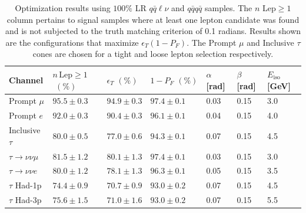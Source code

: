 \begin{table}

\begin{tabular}{|p{}|p{}p{}p{}p{}p{}p{}|}

\hline 
Channel & $n\,\text{Lep}\geq 1$ $\,\, (\%)$  & $\epsilon_T \, \, (\%)$ & $1-P_{F} \, \, (\%)$ & $\alpha$ [rad] & $\beta$ [rad] & $E_{\text{iso}}$ [GeV] \\ 
\hline 
Prompt $\mu$ & $95.5 \pm 0.3$  & $94.9 \pm 0.3$ & $97.4 \pm 0.1$& 0.03 & 0.15 & 3.0 \\ 

Prompt $e$ & $92.0 \pm 0.3$  & $90.4 \pm 0.3$ & $96.1 \pm 0.1$ & 0.04 & 0.15 & 4.0 \\ 

Inclusive $\tau$ & $80.0 \pm 0.5$  &  $77.0 \pm 0.6$ & $94.3 \pm 0.1$& 0.07 & 0.15 & 4.5 \\ 


 \hline
$\tau \rightarrow \nu \nu \mu$ & $81.5 \pm 1.2$  & $80.1 \pm 1.3$ & $97.4 \pm 0.1$ & 0.03 & 0.15 & 3.0 \\ 
 
$\tau \rightarrow \nu \nu e$  &  $80.0 \pm 1.2$&   $78.1 \pm 1.3$ & $96.3 \pm 0.1$  & 0.05 & 0.15 & 3.5 \\ 
 
$\tau$ Had-1p & $74.4 \pm 0.9$  & $70.7 \pm 0.9$ & $93.0 \pm 0.2$ & 0.07 & 0.15 & 4.5 \\ 
 
$\tau$ Had-3p &  $75.6 \pm 1.5$  & $71.0 \pm 1.6$ & $93.0 \pm 0.2$ & 0.07 & 0.15 & 5.5  \\
\hline
\end{tabular} 
\caption{Optimization results using $100 \%$ LR $q\bar{q}\ell \nu$ and $q\bar{q} q\bar{q}$ samples. The $n \, \, \text{Lep} \geq 1$ column pertains to signal samples where at least one lepton candidate was found and is not subjected to the truth matching criterion of 0.1 radians. Results shown are the configurations that maximize $\epsilon_T(1-P_F)$. The Prompt $\mu$ and Inclusive $\tau$ cones are chosen for a tight and loose lepton selection respectively. }
\label{tab:taufinderopt}
\end{table}
  


